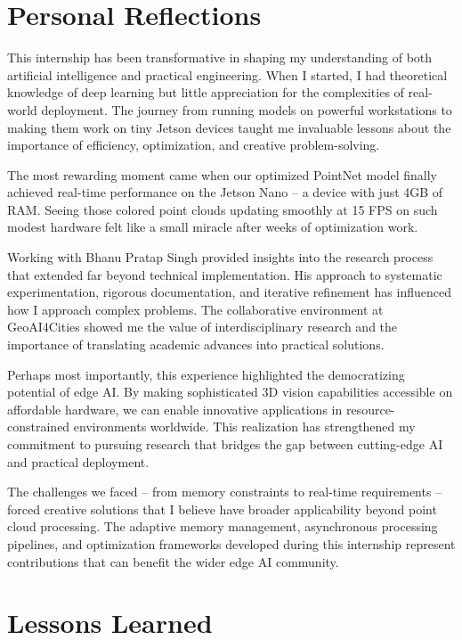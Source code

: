 \documentclass[12pt,a4paper]{report}
\begin{document}
\section{Personal Reflections}

This internship has been transformative in shaping my understanding of both artificial intelligence and practical engineering. When I started, I had theoretical knowledge of deep learning but little appreciation for the complexities of real-world deployment. The journey from running models on powerful workstations to making them work on tiny Jetson devices taught me invaluable lessons about the importance of efficiency, optimization, and creative problem-solving.

The most rewarding moment came when our optimized PointNet model finally achieved real-time performance on the Jetson Nano – a device with just 4GB of RAM. Seeing those colored point clouds updating smoothly at 15 FPS on such modest hardware felt like a small miracle after weeks of optimization work.

Working with Bhanu Pratap Singh provided insights into the research process that extended far beyond technical implementation. His approach to systematic experimentation, rigorous documentation, and iterative refinement has influenced how I approach complex problems. The collaborative environment at GeoAI4Cities showed me the value of interdisciplinary research and the importance of translating academic advances into practical solutions.

Perhaps most importantly, this experience highlighted the democratizing potential of edge AI. By making sophisticated 3D vision capabilities accessible on affordable hardware, we can enable innovative applications in resource-constrained environments worldwide. This realization has strengthened my commitment to pursuing research that bridges the gap between cutting-edge AI and practical deployment.

The challenges we faced – from memory constraints to real-time requirements – forced creative solutions that I believe have broader applicability beyond point cloud processing. The adaptive memory management, asynchronous processing pipelines, and optimization frameworks developed during this internship represent contributions that can benefit the wider edge AI community.

\section{Lessons Learned}
\end{document}
